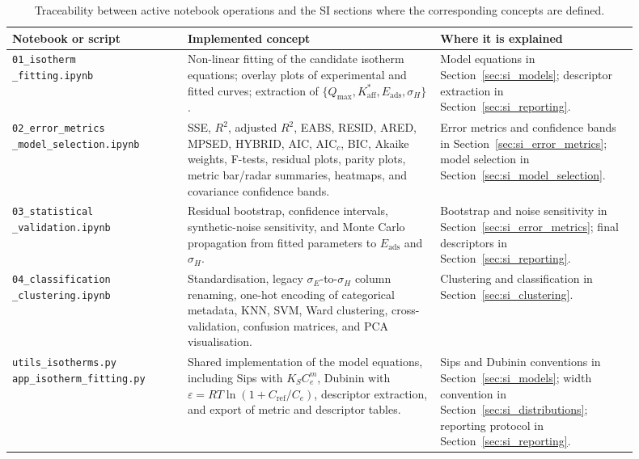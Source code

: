 \documentclass[journal=jacsat,manuscript=article]{achemso}
\begin{document}
\begin{table}[H]
	\centering
	\caption{Traceability between active notebook operations and the
	SI sections where the corresponding concepts are defined.}
	\label{tab:si_notebook_traceability}
	\small
	\begin{tabular}{p{0.25\linewidth}p{0.36\linewidth}p{0.29\linewidth}}
		\toprule
		\textbf{Notebook or script} & \textbf{Implemented concept} &
		\textbf{Where it is explained} \\
		\midrule
		\makecell[l]{\texttt{01\_isotherm}\\\texttt{\_fitting.ipynb}} &
		Non-linear fitting of the candidate isotherm equations;
		overlay plots of experimental and fitted curves; extraction of
		\(\{Q_{\max},K_{\mathrm{aff}}^{\ast},E_{\mathrm{ads}},\sigma_H\}\). &
		Model equations in Section~\ref{sec:si_models}; descriptor
		extraction in Section~\ref{sec:si_reporting}. \\
		\addlinespace
		\makecell[l]{\texttt{02\_error\_metrics}\\\texttt{\_model\_selection.ipynb}} &
		SSE, \(R^2\), adjusted \(R^2\), EABS, RESID, ARED, MPSED,
		HYBRID, AIC, AIC$_c$, BIC, Akaike weights, F-tests, residual
		plots, parity plots, metric bar/radar summaries, heatmaps, and
		covariance confidence bands. &
		Error metrics and confidence bands in Section~\ref{sec:si_error_metrics};
		model selection in Section~\ref{sec:si_model_selection}. \\
		\addlinespace
		\makecell[l]{\texttt{03\_statistical}\\\texttt{\_validation.ipynb}} &
		Residual bootstrap, confidence intervals, synthetic-noise
		sensitivity, and Monte Carlo propagation from fitted parameters
		to \(E_{\mathrm{ads}}\) and \(\sigma_H\). &
		Bootstrap and noise sensitivity in Section~\ref{sec:si_error_metrics};
		final descriptors in Section~\ref{sec:si_reporting}. \\
		\addlinespace
		\makecell[l]{\texttt{04\_classification}\\\texttt{\_clustering.ipynb}} &
		Standardisation, legacy \(\sigma_E\)-to-\(\sigma_H\) column
		renaming, one-hot encoding of categorical metadata, KNN, SVM,
		Ward clustering, cross-validation, confusion matrices, and PCA
		visualisation. &
		Clustering and classification in Section~\ref{sec:si_clustering}. \\
		\addlinespace
		\makecell[l]{\texttt{utils\_isotherms.py}\\
		\texttt{app\_isotherm\_fitting.py}} &
		Shared implementation of the model equations, including Sips with
		\(K_S C_e^m\), Dubinin with
		\(\varepsilon=RT\ln(1+C_{\mathrm{ref}}/C_e)\), descriptor
		extraction, and export of metric and descriptor tables. &
		Sips and Dubinin conventions in Section~\ref{sec:si_models};
		width convention in Section~\ref{sec:si_distributions};
		reporting protocol in Section~\ref{sec:si_reporting}. \\
		\bottomrule
	\end{tabular}
\end{table}
\end{document}
